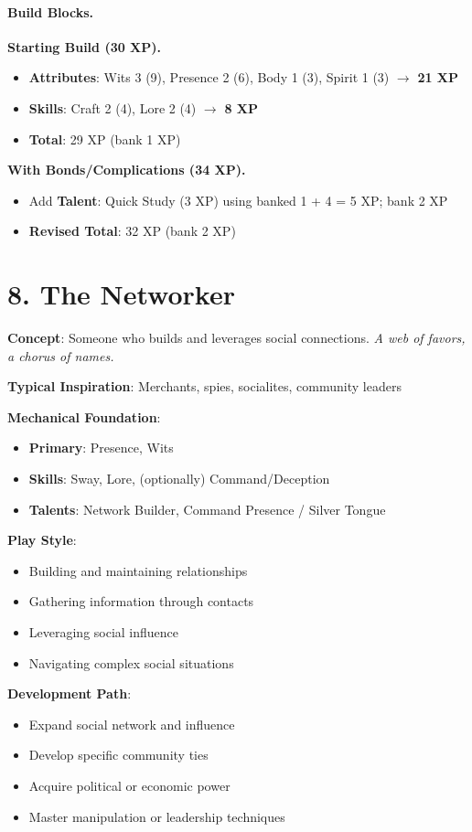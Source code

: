 \paragraph{Build Blocks.}
\textbf{Starting Build (30 XP).}
\begin{itemize}
\item \textbf{Attributes}: Wits 3 (9), Presence 2 (6), Body 1 (3), Spirit 1 (3) $\rightarrow$ \textbf{21 XP}
\item \textbf{Skills}: Craft 2 (4), Lore 2 (4) $\rightarrow$ \textbf{8 XP}
\item \textbf{Total}: 29 XP (bank 1 XP)
\end{itemize}
\textbf{With Bonds/Complications (34 XP).}
\begin{itemize}
\item Add \textbf{Talent}: Quick Study (3 XP) using banked 1 + 4 = 5 XP; bank 2 XP
\item \textbf{Revised Total}: 32 XP (bank 2 XP)
\end{itemize}

\section{8. The Networker}

\textbf{Concept}: Someone who builds and leverages social connections. \emph{A web of favors, a chorus of names.}

\textbf{Typical Inspiration}: Merchants, spies, socialites, community leaders

\textbf{Mechanical Foundation}:
\begin{itemize}
\item \textbf{Primary}: Presence, Wits
\item \textbf{Skills}: Sway, Lore, (optionally) Command/Deception
\item \textbf{Talents}: Network Builder, Command Presence / Silver Tongue
\end{itemize}

\textbf{Play Style}:
\begin{itemize}
\item Building and maintaining relationships
\item Gathering information through contacts
\item Leveraging social influence
\item Navigating complex social situations
\end{itemize}

\textbf{Development Path}:
\begin{itemize}
\item Expand social network and influence
\item Develop specific community ties
\item Acquire political or economic power
\item Master manipulation or leadership techniques
\end{itemize}

